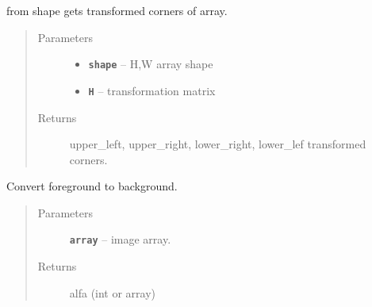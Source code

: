 \documentclass[letterpaper,10pt,english]{sphinxmanual}
\begin{document}
\begin{fulllineitems}
\label{RRtoolbox.lib.arrayops:RRtoolbox.lib.arrayops.basic.getTransformedCorners}
from shape gets transformed corners of array.
\begin{quote}\begin{description}
\item[{Parameters}] \leavevmode\begin{itemize}
\item {} 
\textbf{\texttt{shape}} -- H,W array shape

\item {} 
\textbf{\texttt{H}} -- transformation matrix

\end{itemize}

\item[{Returns}] \leavevmode
upper\_left, upper\_right, lower\_right, lower\_lef transformed corners.

\end{description}\end{quote}

\end{fulllineitems}


\begin{fulllineitems}
\label{RRtoolbox.lib.arrayops:RRtoolbox.lib.arrayops.basic.getTransparency}
Convert foreground to background.
\begin{quote}\begin{description}
\item[{Parameters}] \leavevmode
\textbf{\texttt{array}} -- image array.

\item[{Returns}] \leavevmode
alfa (int or array)

\end{description}\end{quote}

\end{fulllineitems}

\end{document}
